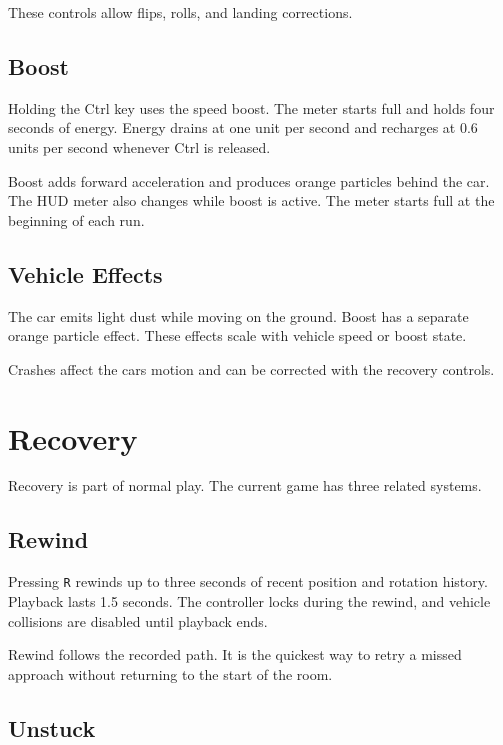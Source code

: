 \documentclass[11pt,a4paper]{article}
\begin{document}
These controls allow flips, rolls, and landing corrections.

\subsection{Boost}\label{boost}

Holding the Ctrl key uses the speed boost. The meter starts full and holds four seconds of energy. Energy drains at one unit per second and recharges at 0.6 units per second whenever Ctrl is released.

Boost adds forward acceleration and produces orange particles behind the car. The HUD meter also changes while boost is active. The meter starts full at the beginning of each run.

\subsection{Vehicle Effects}\label{vehicle-effects}

The car emits light dust while moving on the ground. Boost has a separate orange particle effect. These effects scale with vehicle speed or boost state.

Crashes affect the car\textquotesingle s motion and can be corrected with the recovery controls.

\section{Recovery}\label{recovery}

Recovery is part of normal play. The current game has three related systems.

\subsection{Rewind}\label{rewind}

Pressing \texttt{R} rewinds up to three seconds of recent position and rotation history. Playback lasts 1.5 seconds. The controller locks during the rewind, and vehicle collisions are disabled until playback ends.

Rewind follows the recorded path. It is the quickest way to retry a missed approach without returning to the start of the room.

\subsection{Unstuck}\label{unstuck}
\end{document}
